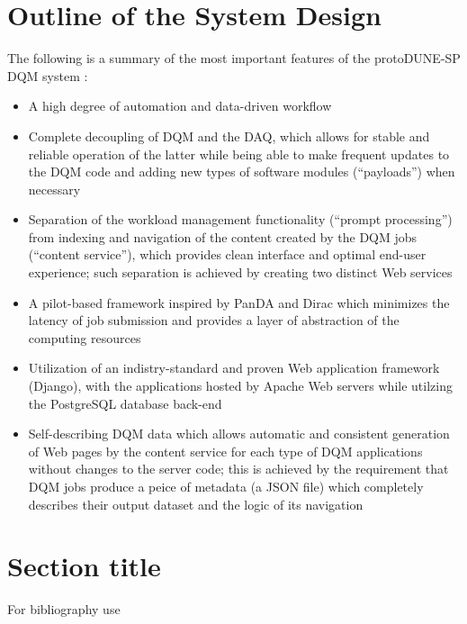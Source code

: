 \documentclass{webofc}
\newcommand{\pd}{protoDUNE\xspace}
\begin{document}
\section{Outline of the System Design}
\label{sec:outline}

The following is a summary of the most important features of the \pd-SP DQM system  \cite{chep18}:
\begin{itemize}

\item A high degree of automation and data-driven workflow

\item Complete decoupling of DQM and the DAQ, which allows for stable and reliable operation of
the latter while being able to make frequent updates to the DQM code and adding new types of
software modules (``payloads'') when necessary

\item Separation of the workload management functionality (``prompt processing'') from
indexing and navigation of the content created by the DQM  jobs (``content service''), which provides clean
interface and optimal end-user experience; such separation is achieved by creating two
distinct Web services

\item A pilot-based framework inspired by PanDA and Dirac \cite{panda,dirac}
which minimizes the latency of job submission and provides a layer of abstraction of the computing resources

\item Utilization of an indistry-standard and proven Web application framework (Django)\cite{django},
with the applications hosted by Apache Web servers while utilzing the PostgreSQL database
back-end

\item Self-describing DQM data which allows automatic and consistent generation of Web pages
by the content service
for each type of DQM applications without changes to the server code; this is achieved by the
requirement that DQM jobs produce a peice of metadata (a JSON file) which completely
describes their output dataset and the logic of its navigation

\end{itemize}

\section{Section title}
\label{sec-1}
For bibliography use \cite{RefJ}
\end{document}
